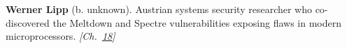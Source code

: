 \textbf{Werner Lipp} (b. unknown). Austrian systems security researcher who co-discovered the Meltdown and Spectre vulnerabilities exposing flaws in modern microprocessors. \emph{[Ch.~\hyperref[ch:speculativeexecutionattacks]{18}]}

